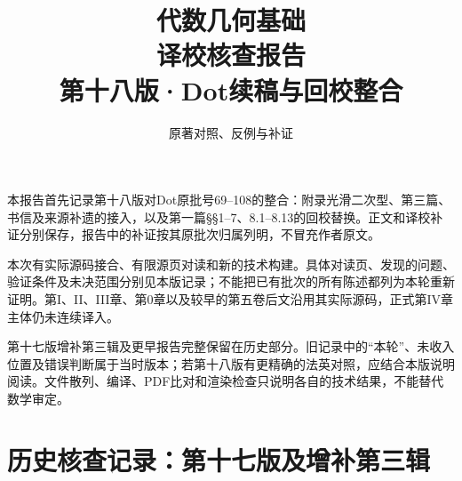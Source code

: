 
\newcommand{\RR}{\mathcal R}
\newcommand{\FF}{\mathcal F}
\newcommand{\GG}{\mathcal G}
\newcommand{\MM}{\mathcal M}
\newcommand{\JJ}{\mathcal J}
\newcommand{\oldauditsrc}[1]{\par\noindent\textbf{原文位置：}#1。\par}
\newcommand{\kind}[2]{\noindent\textbf{分类：#1。}\ #2\par}
\newcommand{\lead}[1]{\par\noindent\textbf{#1}\quad}
\newenvironment{analysisproof}{\par\noindent\textbf{该轮核查的反例或补证。}\ }{\par}

\title{代数几何基础\\译校核查报告\\[1em]\large 第十八版·Dot续稿与回校整合}
\author{原著对照、反例与补证}
\date{}

\frontmatter
\maketitle
{}
本报告首先记录第十八版对Dot原批号69--108的整合：附录光滑二次型、第三篇、书信及来源补遗的接入，以及第一篇§§1--7、8.1--8.13的回校替换。正文和译校补证分别保存，报告中的补证按其原批次归属列明，不冒充作者原文。

本次有实际源码接合、有限源页对读和新的技术构建。具体对读页、发现的问题、验证条件及未决范围分别见本版记录；不能把已有批次的所有陈述都列为本轮重新证明。第I、II、III章、第0章以及较早的第五卷后文沿用其实际源码，正式第IV章主体仍未连续译入。

第十七版增补第三辑及更早报告完整保留在历史部分。旧记录中的“本轮”、未收入位置及错误判断属于当时版本；若第十八版有更精确的法英对照，应结合本版说明阅读。文件散列、编译、PDF比对和渲染检查只说明各自的技术结果，不能替代数学审定。

\tableofcontents
\mainmatter




\setcounter{secnumdepth}{-2}
\part{历史核查记录：第十七版及增补第三辑}
\setcounter{secnumdepth}{2}






\setcounter{secnumdepth}{-2}
